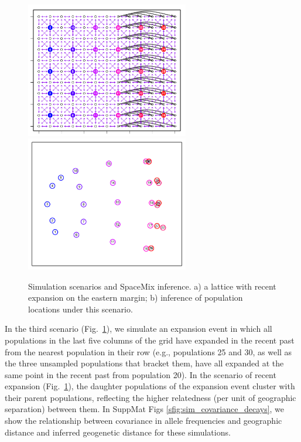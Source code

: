 \documentclass[12pt]{article}
\begin{document}
\begin{figure}
	\centering
			{\includegraphics[width=2.8in,height=2.33in]{figs/sims/expansion_lattice.png}}
			{\includegraphics[width=2.8in,height=2.33in]{figs/sims/GeoGenMap_expansion.pdf}}
	\caption{Simulation scenarios and SpaceMix inference.  a) a lattice with recent expansion on the eastern margin; b) inference of population locations under this scenario.}\label{sfig:expansion_scenarios}
\end{figure}

In the third scenario (Fig.\ \ref{sfig:expansion_scenarios}), we simulate an expansion event in which all populations in the last five columns of the grid have expanded in the recent past from the nearest population in their row (e.g., populations 25 and 30, as well as the three unsampled populations that bracket them, have all expanded at the same point in the recent past from population 20). In the scenario of recent expansion (Fig.\ \ref{sfig:expansion_scenarios}), the daughter populations of the expansion event cluster with their parent populations, reflecting the higher relatedness (per unit of geographic separation) between them.  In SuppMat Figs \ref{sfig:sim_covariance_decays}, we show the relationship between covariance in allele frequencies and geographic distance and inferred geogenetic distance for these simulations.
\end{document}
